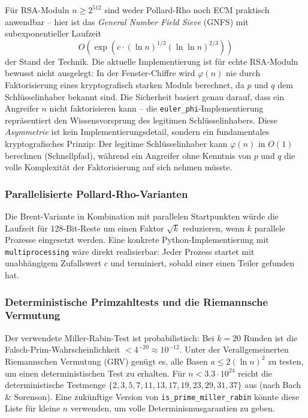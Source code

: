 ﻿\documentclass[12pt, a4paper]{article}
\theoremstyle{plain}
\theoremstyle{definition}
\theoremstyle{remark}
\begin{document}
F\"ur RSA-Moduln $n \ge 2^{512}$ sind weder Pollard-Rho noch ECM
praktisch anwendbar -- hier ist das \emph{General Number Field Sieve}
(GNFS) mit subexponentieller Laufzeit
\[
  O\!\left(\exp\!\left(c \cdot (\ln n)^{1/3}(\ln\ln n)^{2/3}\right)\right)
\]
der Stand der Technik. Die aktuelle Implementierung ist f\"ur
echte RSA-Moduln bewusst nicht ausgelegt: In der Fenster-Chiffre
wird $\varphi(n)$ nie durch Faktorisierung eines kryptografisch
starken Moduls berechnet, da $p$ und $q$ dem Schl\"usselinhaber
bekannt sind. Die Sicherheit basiert genau darauf, dass ein Angreifer
$n$ nicht faktorisieren kann -- die \texttt{euler\_phi}-Implementierung
repr\"asentiert den Wissensvorsprung des legitimen Schl\"usselinhabers.
Diese \emph{Asymmetrie} ist kein Implementierungsdetail, sondern ein
fundamentales kryptografisches Prinzip: Der legitime Schl\"ussel\-inhaber
kann $\varphi(n)$ in $O(1)$ berechnen (Schnellpfad), w\"ahrend ein
Angreifer ohne Kenntnis von $p$ und $q$ die volle Komplexit\"at der
Faktorisierung auf sich nehmen m\"usste.

\subsubsection{Parallelisierte Pollard-Rho-Varianten}

Die Brent-Variante in Kombination mit
parallelen Startpunkten w\"urde die Laufzeit f\"ur 128-Bit-Reste
um einen Faktor $\sqrt{k}$ reduzieren, wenn $k$ parallele Prozesse
eingesetzt werden. Eine konkrete Python-Implementierung mit
\texttt{multiprocessing} w\"are direkt realisierbar: Jeder Prozess
startet mit unabh\"angigem Zufallswert $c$ und terminiert, sobald
einer einen Teiler gefunden hat.

\subsubsection{Deterministische Primzahltests und die Riemannsche Vermutung}

Der verwendete Miller-Rabin-Test ist probabilistisch: Bei $k = 20$
Runden ist die Falsch-Prim-Wahrscheinlichkeit $< 4^{-20} \approx 10^{-12}$.
Unter der Verallgemeinerten Riemannschen Vermutung (GRV) gen\"ugt es,
alle Basen $a \le 2(\ln n)^2$ zu testen, um einen deterministischen
Test zu erhalten. F\"ur $n < 3.3 \cdot 10^{24}$ reicht die deterministische
Testmenge $\{2, 3, 5, 7, 11, 13, 17, 19, 23, 29, 31, 37\}$ aus
(nach Bach \& Sorenson). Eine zuk\"unftige Version von
\texttt{is\_prime\_miller\_rabin} k\"onnte diese Liste f\"ur kleine $n$
verwenden, um volle Determinismusgarantien zu geben.
\end{document}
